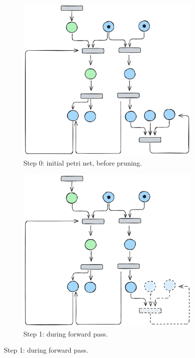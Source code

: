 \begin{figure}[htbp]
	\centering
	
	\begin{subfigure}[b]{0.45\textwidth}
		\centering
		\includegraphics[width=\textwidth]{plots/bidirectional_pruning_step_a_init.pdf}
		\caption{Step 0: initial petri net, before pruning.}\label{fig:step:a}
	\end{subfigure}\hfill
	\begin{subfigure}[b]{0.45\textwidth}
		\centering
		\includegraphics[width=\textwidth]{plots/bidirectional_pruning_step_b_forward.pdf}
		\caption{Step 1: during forward pass.}\label{fig:step:b}
	\end{subfigure}\hfill
	

\end{figure}
